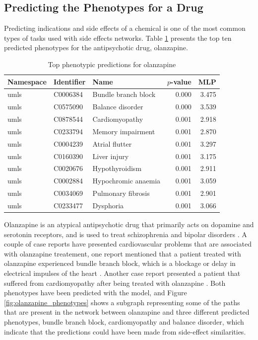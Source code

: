 \subsection{Predicting the Phenotypes for a Drug}
Predicting indications and side effects of a chemical is one of the most common types of tasks used with side effects networks. Table \ref{tab:drug_phenotype} presents the top ten predicted phenotypes for the antipsychotic drug, olanzapine.

\begin{table}[!ht]
    \centering
    \begin{tabular}{|l|l|l|r|r|} 
        \hline
        \textbf{Namespace} & \textbf{Identifier} & \textbf{Name} & \textbf{$p$-value} & \textbf{MLP} \\
        \hline
        umls & C0006384 & Bundle branch block & 0.000 & 3.475 \\
        \hline
        umls & C0575090 & Balance disorder & 0.000 & 3.539 \\
        \hline
        umls & C0878544 & Cardiomyopathy & 0.001 & 2.918 \\
        \hline
        umls & C0233794 & Memory impairment & 0.001 & 2.870 \\
        \hline
        umls & C0004239 & Atrial flutter & 0.001 & 3.297 \\
        \hline
        umls & C0160390 & Liver injury & 0.001 & 3.175 \\
        \hline
        umls & C0020676 & Hypothyroidism & 0.001 & 2.911 \\
        \hline
        umls & C0002884 & Hypochromic anaemia & 0.001 & 3.059 \\
        \hline
        umls & C0034069 & Pulmonary fibrosis & 0.001 & 2.901 \\
        \hline
        umls & C0233477 & Dysphoria & 0.001 & 3.066 \\
        \hline
    \end{tabular}
    \caption{Top phenotypic predictions for olanzapine}
    \label{tab:drug_phenotype}
\end{table}

Olanzapine is an atypical antipsychotic drug that primarily acts on dopamine and serotonin receptors, and is used to treat schizophrenia and bipolar disorders \cite{thomas_olanzapine_2019}. A couple of case reports have presented cardiovascular problems that are associated with olanzapine treatement, one report mentioned that a patient treated with olanzapine experienced bundle branch block, which is a blockage or delay in electrical impulses of the heart \cite{ninan_case_2017}. Another case report presented a patient that suffered from cardiomyopathy after being treated with olanzapine \cite{puttegowda_olanzapine_2016}. Both phenotypes have been predicted with the model, and Figure \ref{fig:olanzapine_phenotypes} shows a subgraph representing some of the paths that are present in the network between olanzapine and three different predicted phenotypes, bundle branch block, cardiomyopathy and balance disorder, which indicate that the predictions could have been made from side-effect similarities.

